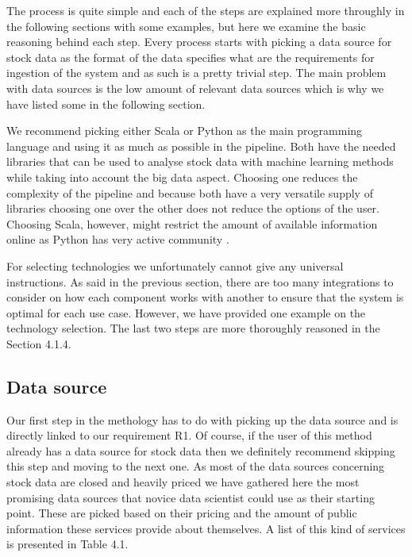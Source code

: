 The process is quite simple and each of the steps are explained more throughly in the following sections with some examples, but here we examine the basic reasoning behind each step.
Every process starts with picking a data source for stock data as the format of the data specifies what are the requirements for ingestion of the system and as such is a pretty trivial step.
The main problem with data sources is the low amount of relevant data sources which is why we have listed some in the following section.

We recommend picking either Scala or Python as the main programming language and using it as much as possible in the pipeline.
Both have the needed libraries that can be used to analyse stock data with machine learning methods while taking into account the big data aspect.
Choosing one reduces the complexity of the pipeline and because both have a very versatile supply of libraries choosing one over the other does not reduce the options of the user.
Choosing Scala, however, might restrict the amount of available information online as Python has very active community \cite{giang}.

For selecting technologies we unfortunately cannot give any universal instructions.
As said in the previous section, there are too many integrations to consider on how each component works with another to ensure that the system is optimal for each use case.
However, we have provided one example on the technology selection.
The last two steps are more thoroughly reasoned in the Section 4.1.4.

\subsection{Data source}

Our first step in the methology has to do with picking up the data source and is directly linked to our requirement R1.
Of course, if the user of this method already has a data source for stock data then we definitely recommend skipping this step and moving to the next one. 
As most of the data sources concerning stock data are closed and heavily priced we have gathered here the most promising data sources that novice data scientist could use as their starting point.
These are picked based on their pricing and the amount of public information these services provide about themselves.
A list of this kind of services is presented in Table 4.1.

